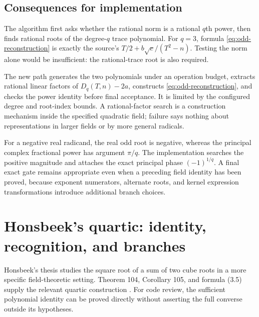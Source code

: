 \documentclass[11pt,letterpaper]{article}
\numberwithin{equation}{section}
\theoremstyle{definition}\newtheorem{definition}[theorem]{Definition}
\theoremstyle{remark}\newtheorem{remark}[theorem]{Remark}
\begin{document}
\subsection{Consequences for implementation}
The algorithm first asks whether the rational norm is a rational $q$th power, then finds rational roots of the degree-$q$ trace polynomial. For $q=3$, formula \eqref{eq:odd-reconstruction} is exactly the source's $T/2+b\sqrt c/(T^2-n)$. Testing the norm alone would be insufficient: the rational-trace root is also required.

The new path generates the two polynomials under an operation budget, extracts rational linear factors of $D_q(T,n)-2a$, constructs \eqref{eq:odd-reconstruction}, and checks the power identity before final acceptance. It is limited by the configured degree and root-index bounds. A rational-factor search is a construction mechanism inside the specified quadratic field; failure says nothing about representations in larger fields or by more general radicals.

For a negative real radicand, the real odd root is negative, whereas the principal complex fractional power has argument $\pi/q$. The implementation searches the positive magnitude and attaches the exact principal phase $(-1)^{1/q}$. A final exact gate remains appropriate even when a preceding field identity has been proved, because exponent numerators, alternate roots, and kernel expression transformations introduce additional branch choices.

\section{Honsbeek's quartic: identity, recognition, and branches}
\label{sec:honsbeek}
Honsbeek's thesis studies the square root of a sum of two cube roots in a more specific field-theoretic setting. Theorem 104, Corollary 105, and formula (3.5) supply the relevant quartic construction \cite{honsbeek}. For code review, the sufficient polynomial identity can be proved directly without asserting the full converse outside its hypotheses.
\end{document}
